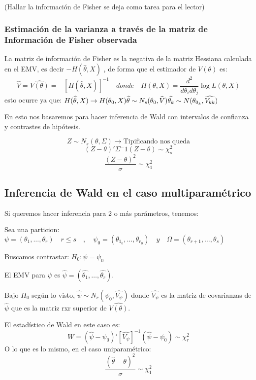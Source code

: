 (Hallar la información de Fisher se deja como tarea para el lector)

\subsubsection{Estimación de la varianza a través de la matriz de Información de Fisher observada}

La matriz de información de Fisher es la negativa de la matriz Hessiana calculada en el EMV, es decir $-H(\widehat{\theta},X)$
, de forma que el estimador de $V(\theta)$ es:
\[
\widehat{V}=\widehat{V(\theta)}=-[H(\widehat{\theta},X)]^{-1} \quad donde\quad H(\theta,X)=\frac{d^2}{d \theta_i d \theta_j} \log L(\theta,X)
\]
esto ocurre ya que:
\(
H(\widehat{\theta},X) \to H(\theta_0,X)
\\ \widehat{\theta} \sim N_s(\theta_0,\widehat{V})
\widehat{\theta_k} \sim N(\theta_{0_k},\widehat{V_{kk}})
\)

En esto nos basaremos para hacer inferencia de Wald con intervalos de confianza y contrastes de hipótesis.

\[
Z \sim N_s(\theta,\Sigma) \to \text{Tipificando nos queda}
\]
\[
(Z-\theta)' \Sigma^-1 (Z-\theta) \sim \chi_s^2
\]
\[
\frac{(Z-\theta)^2}{\sigma} \sim \chi^2_1
\]

\subsection{Inferencia de Wald en el caso multiparamétrico}

Si queremos hacer inferencia para 2 o más parámetros, tenemos:

Sea una particion:
\(
\psi=(\theta_1,\dots,\theta_r) \quad r \leq s \quad, \quad
\psi_0=(\theta_{1_0},\dots,\theta_{r_0}) \quad y \quad 
\Omega=(\theta_{r+1},\dots,\theta_s)
\)

Buscamos contrastar: $H_0:\psi=\psi_0$

El EMV para $\psi$ es $\widehat{\psi}=(\widehat{\theta_1},\dots,\widehat{\theta_r})$.

Bajo $H_0$ según lo visto, $\widehat{\psi}\sim N_r(\psi_0,\widehat{V_\psi})$
donde $\widehat{V_\psi}$ es la matriz de covarianzas de $\widehat{\psi}$ que es la matriz rxr superior de $\widehat{V(\theta)}$.

El estadístico de Wald en este caso es:
\[
W=(\widehat{\psi}-\psi_0)'[\widehat{V_\psi}]^{-1}(\widehat{\psi}-\psi_0)\sim\chi^2_r
\]
O lo que es lo mismo, en el caso uniparamétrico:
\[
\frac{(\widehat{\theta}-\theta)^2}{\sigma}\sim \chi^2_1
\]

